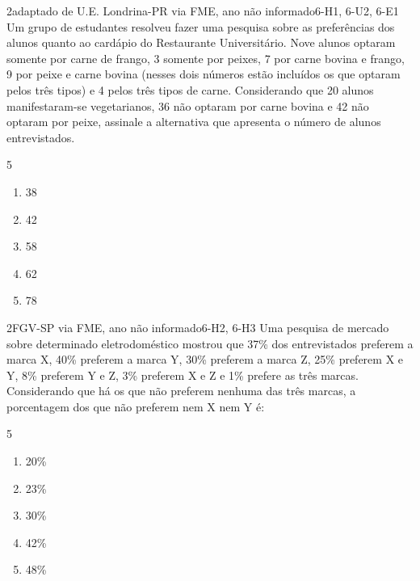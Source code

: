 \begin{questao}{2}{adaptado de U.E. Londrina-PR via FME, ano não informado}{6-H1, 6-U2, 6-E1}\label{u6:uel20}
Um grupo de estudantes resolveu fazer uma pesquisa sobre as preferências dos alunos quanto ao cardápio do Restaurante Universitário. Nove alunos optaram somente por carne de frango, 3 somente por peixes, 7 por carne bovina e frango, 9 por peixe e carne bovina (nesses dois números estão incluídos os que optaram pelos três tipos) e 4 pelos três tipos de carne. Considerando que 20 alunos manifestaram-se vegetarianos, 36 não optaram por carne bovina e 42 não optaram por peixe, assinale a alternativa que apresenta o número de alunos entrevistados.
\begin{multicols}{5}
\begin{enumerate}[label=\alph*)]
  \item 38
  \item 42
  \item 58
  \item 62
  \item 78
\end{enumerate}
\end{multicols}
\end{questao}

\begin{questao}{2}{FGV-SP via FME, ano não informado}{6-H2, 6-H3}\label{u6:fgv36}
Uma pesquisa de mercado sobre determinado eletrodoméstico mostrou que 37\% dos entrevistados preferem a marca X, 40\% preferem a marca Y, 30\% preferem a marca Z, 25\% preferem X e Y, 8\% preferem Y e Z, 3\% preferem X e Z e 1\% prefere as três marcas. Considerando que há os que não preferem nenhuma das três marcas, a porcentagem dos que não preferem nem X nem Y é:
\begin{multicols}{5}
\begin{enumerate}[label=\alph*)]
  \item 20\%
  \item 23\%
  \item 30\%
  \item 42\%
  \item 48\%
\end{enumerate}
\end{multicols}
\end{questao}

